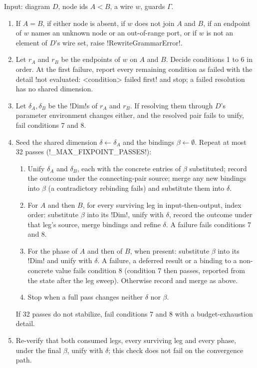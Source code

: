 \begin{algorithm}\label{alg:rules-fusion-resolution}
Input: diagram $D$, node ids $A<B$, a wire $w$, guards $\Gamma$.
\begin{enumerate}
\item If $A=B$, if either node is absent, if $w$ does not join $A$ and $B$, if an endpoint of $w$ names an unknown node or an out-of-range port, or if $w$ is not an element of $D$'s wire set, raise \py!RewriteGrammarError!.
\item Let $r_A$ and $r_B$ be the endpoints of $w$ on $A$ and $B$. Decide conditions 1 to 6 in order. At the first failure, report every remaining condition as failed with the detail \code!not evaluated: <condition> failed first! and stop; a failed resolution has no shared dimension.
\item Let $\delta_A,\delta_B$ be the \py!Dim!s of $r_A$ and $r_B$. If resolving them through $D$'s parameter environment changes either, and the resolved pair fails to unify, fail conditions 7 and 8.
\item Seed the shared dimension $\delta\leftarrow\delta_A$ and the bindings $\beta\leftarrow\emptyset$. Repeat at most 32 passes (\py!_MAX_FIXPOINT_PASSES!):
  \begin{enumerate}
  \item Unify $\delta_A$ and $\delta_B$, each with the concrete entries of $\beta$ substituted; record the outcome under the connecting-pair source; merge any new bindings into $\beta$ (a contradictory rebinding fails) and substitute them into $\delta$.
  \item For $A$ and then $B$, for every surviving leg in input-then-output, index order: substitute $\beta$ into its \py!Dim!, unify with $\delta$, record the outcome under that leg's source, merge bindings and refine $\delta$. A failure fails conditions 7 and 8.
  \item For the phase of $A$ and then of $B$, when present: substitute $\beta$ into its \py!Dim! and unify with $\delta$. A failure, a deferred result or a binding to a non-concrete value fails condition 8 (condition 7 then passes, reported from the state after the leg sweep). Otherwise record and merge as above.
  \item Stop when a full pass changes neither $\delta$ nor $\beta$.
  \end{enumerate}
  If 32 passes do not stabilize, fail conditions 7 and 8 with a budget-exhaustion detail.
\item Re-verify that both consumed legs, every surviving leg and every phase, under the final $\beta$, unify with $\delta$; this check does not fail on the convergence path.

\end{enumerate}
\end{algorithm}
